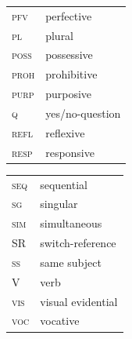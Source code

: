\documentclass[output=paper,modfonts,nonflat,colorlinks,citecolor=brown]{langscibook}
\begin{document}
\begin{tabularx}{.45\textwidth}{lQ}
\scshape pfv & perfective\\
\scshape pl & plural\\
\scshape poss & possessive\\
\scshape proh & prohibitive\\
\scshape purp & purposive\\
\scshape q & yes/no-question\\
\scshape refl & reflexive\\
\scshape resp & responsive\\
\end{tabularx}
\begin{tabularx}{.45\textwidth}{lQ}
\scshape seq & sequential\\
\scshape sg & 	singular\\
\scshape sim & simultaneous\\
\scshape SR & switch-reference\\
\scshape ss & same subject\\
\scshape V & verb\\
\scshape vis & visual evidential \\
\scshape voc & vocative \\
\end{tabularx}



\printbibliography[heading=subbibliography,notkeyword=this]
\end{document}
